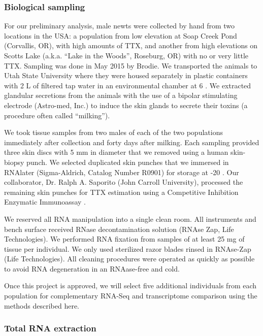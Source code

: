 \subsubsection{Biological sampling}

For our preliminary analysis, male newts were collected by hand from two locations in the USA: a population from low elevation at Soap Creek Pond (Corvallis, OR), with high amounts of TTX, and another from high elevations on Scotts Lake (a.k.a. ``Lake in the Woods'', Roseburg, OR) with no or very little TTX. Sampling was done in May 2015 by Brodie. We transported the animals to Utah State University where they were housed separately in plastic containers with 2 L of filtered tap water in an environmental chamber at 6 \celsius. We extracted glandular secretions from the animals with the use of a bipolar stimulating electrode (Astro-med, Inc.) to induce the skin glands to secrete their toxins (a procedure often called ``milking'').

We took tissue samples from two males of each of the two populations immediately after collection and forty days after milking. Each sampling provided three skin discs with 5 mm in diameter that we removed using a human skin-biopsy punch. We selected duplicated skin punches that we immersed in RNAlater (Sigma-Aldrich, Catalog Number R0901) for storage at -20 \celsius. Our collaborator, Dr. Ralph A. Saporito (John Carroll University), processed the remaining skin punches for TTX estimation using a Competitive Inhibition Enzymatic Immunoassay \citep[CIEIA; see][]{stokes2012improved}.

We reserved all RNA manipulation into a single clean room. All instruments and bench surface received RNase decontamination solution (RNAse Zap, Life Technologies). We performed RNA fixation from samples of at least 25 mg of tissue per individual.  We only used sterilized razor blades rinsed in RNAse-Zap (Life Technologies). All cleaning procedures were operated as quickly as possible to avoid RNA degeneration in an RNAase-free and cold.

Once this project is approved, we will select five additional individuals from each population for complementary RNA-Seq and transcriptome comparison using the methods described here.

\subsubsection{Total RNA extraction}

